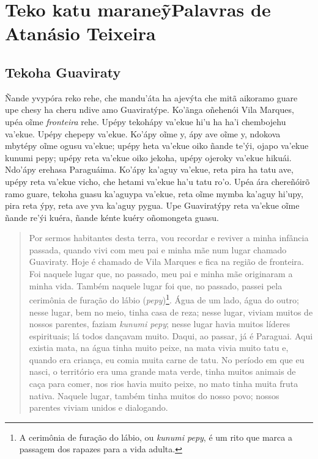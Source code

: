 \part{Teko katu maraneỹ\break Palavras de Atanásio Teixeira}

\chapter{Tekoha Guaviraty}

Ñande yvypóra reko rehe, che mandu'áta ha ajevýta che mitã aikoramo
guare upe chesy ha cheru ndive amo Guaviratýpe. Ko'ãnga oñehenói Vila
Marques, upéa oĩme \emph{fronteira} rehe. Upépy tekohápy va'ekue hi'u ha
ha'i chembojehu va'ekue. Upépy chepepy va'ekue. Ko'ápy oĩme y, ápy ave
oĩme y, ndokova mbytépy oĩme ogusu va'ekue; upépy heta va'ekue oiko
ñande te'ýi, ojapo va'ekue kunumi pepy; upépy reta va'ekue oiko jekoha,
upépy ojeroky va'ekue hikuái. Ndo'ápy erehasa Paraguáima. Ko'ápy ka'aguy
va'ekue, reta pira ha tatu ave, upépy reta va'ekue vicho, che hetami
va'ekue ha'u tatu ro'o. Upéa ára chereñóirõ ramo guare, tekoha guasu
ka'aguypa va'ekue, reta oĩme mymba ka'aguy hi'upy, pira reta ýpy, reta
ave yva ka'aguy pygua. Upe Guaviratýpy reta va'ekue oĩme ñande re'ýi
kuéra, ñande kénte kuéry oñomongeta guasu.

\begin{quote}
Por sermos habitantes desta terra, vou recordar e reviver a minha
infância passada, quando vivi com meu pai e minha mãe num lugar chamado
Guaviraty. Hoje é chamado de Vila Marques e fica na região de fronteira.
Foi naquele lugar que, no passado, meu pai e minha mãe originaram a
minha vida. Também naquele lugar foi que, no passado, passei pela
cerimônia de furação do lábio (\emph{pepy})\footnote{A cerimônia de
  furação do lábio, ou \emph{kunumi pepy}, é um rito que marca a
  passagem dos rapazes para a vida adulta.}. Água de um lado, água do
outro; nesse lugar, bem no meio, tinha casa de reza; nesse lugar, viviam
muitos de nossos parentes, faziam \emph{kunumi pepy}; nesse lugar havia
muitos líderes espirituais; lá todos dançavam muito. Daqui, ao passar,
já é Paraguai. Aqui existia mata, na água tinha muito peixe, na mata
vivia muito tatu e, quando era criança, eu comia muita carne de tatu. No
período em que eu nasci, o território era uma grande mata verde, tinha
muitos animais de caça para comer, nos rios havia muito peixe, no mato
tinha muita fruta nativa. Naquele lugar, também tinha muitos do nosso
povo; nossos parentes viviam unidos e dialogando.
\end{quote}

